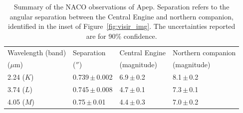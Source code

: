 \documentclass[preprint,times]{aastex61}
\begin{document}
\begin{table}
\renewcommand\tablename{Supplementary Information Table}
  \small
  \caption{\label{tab:naco} Summary of the NACO observations of Apep. Separation refers to the angular separation between the Central Engine and northern companion, identified in the inset of Figure~\ref{fig:visir_img}. The uncertainties reported are for 90\% confidence.}
  \begin{center}
    \begin{tabular}{llll}
    \hline
Wavelength (band) & Separation & Central Engine  & Northern companion   \\
   ($\mu$m)         &    ($''$)    &  (magnitude)     &    (magnitude)   \\
    \hline    
    \hline    
2.24 ($K$)    & 0.739\,$\pm$\,0.002      & 6.9\,$\pm$\,0.2          & 8.1\,$\pm$\,0.2    \\
3.74 ($L$)    & 0.745\,$\pm$\,0.008    & 4.7\,$\pm$\,0.1           & 7.3\,$\pm$\,0.1     \\
4.05 ($M$)    & 0.75\,$\pm$\,0.01        & 4.4\,$\pm$\,0.3           & 7.0\,$\pm$\,0.2    \\
    \hline\end{tabular}
\end{center}
\end{table}
\end{document}
